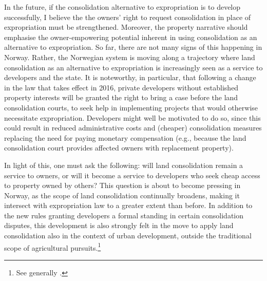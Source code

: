 In the future, if the consolidation alternative to expropriation is to develop successfully, I believe the the owners' right to request consolidation in place of expropriation must be strengthened. Moreover, the property narrative should emphasise the owner-empowering potential inherent in using consolidation as an alternative to expropriation. So far, there are not many signs of this happening in Norway. Rather, the Norwegian system is moving along a trajectory where land consolidation as an alternative to expropriation is increasingly seen as a service to developers and the state. It is noteworthy, in particular, that following a change in the law that takes effect in 2016, private developers without established property interests will be granted the right to bring a case before the land consolidation courts, to seek help in implementing projects that would otherwise necessitate expropriation. Developers might well be motivated to do so, since this could result in reduced administrative costs and (cheaper) consolidation measures replacing the need for paying monetary compensation (e.g., because the land consolidation court provides affected owners with replacement property).

In light of this, one must ask the following: will land consolidation remain a service to owners, or will it become a service to developers who seek cheap access to property owned by others? This question is about to become pressing in Norway, as the scope of land consolidation continually broadens, making it intersect with expropriation law to a greater extent than before. In addition to the new rules granting developers a formal standing in certain consolidation disputes, this development is also strongly felt in the move to apply land consolidation also in the context of urban development, outside the traditional scope of agricultural pursuits.\footnote{See generally \cite{stenseth07}.}



